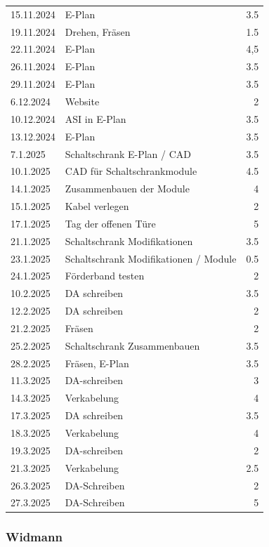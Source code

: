 \begin{longtable}{|l|p{10cm}|r|}
15.11.2024	&	E-Plan	&	3.5	\\
19.11.2024	&	Drehen, Fräsen	&	1.5	\\
22.11.2024	&	E-Plan	&	4,5	\\
26.11.2024	&	E-Plan	&	3.5	\\
29.11.2024	&	E-Plan	&	3.5	\\
6.12.2024	&	Website	&	2	\\
10.12.2024	&	ASI in E-Plan	&	3.5	\\
13.12.2024	&	E-Plan 	&	3.5	\\
7.1.2025	&	Schaltschrank E-Plan / CAD	&	3.5	\\
10.1.2025	&	CAD für Schaltschrankmodule	&	4.5	\\
14.1.2025	&	Zusammenbauen der Module	&	4	\\
15.1.2025	&	Kabel verlegen	&	2	\\
17.1.2025	&	Tag der offenen Türe	&	5	\\
21.1.2025	&	Schaltschrank Modifikationen	&	3.5	\\
23.1.2025	&	Schaltschrank Modifikationen / Module	&	0.5	\\
24.1.2025	&	 Förderband testen	&	2	\\
10.2.2025	&	DA schreiben	&	3.5	\\
12.2.2025	&	DA schreiben	&	2	\\
21.2.2025	&	Fräsen	&	2	\\
25.2.2025	&	Schaltschrank Zusammenbauen	&	3.5	\\
28.2.2025	&	Fräsen, E-Plan	&	3.5	\\
11.3.2025	&	DA-schreiben	&	3	\\
14.3.2025	&	Verkabelung	&	4	\\
17.3.2025	&	DA schreiben	&	3.5	\\
18.3.2025	&	Verkabelung	&	4	\\
19.3.2025	&	DA-schreiben 	&	2	\\
21.3.2025	&	Verkabelung	&	2.5	\\
26.3.2025	&	DA-Schreiben	&	2	\\
27.3.2025 &	DA-Schreiben	&	5	\\
\end{longtable}
\newpage

\subsubsection{Widmann}

